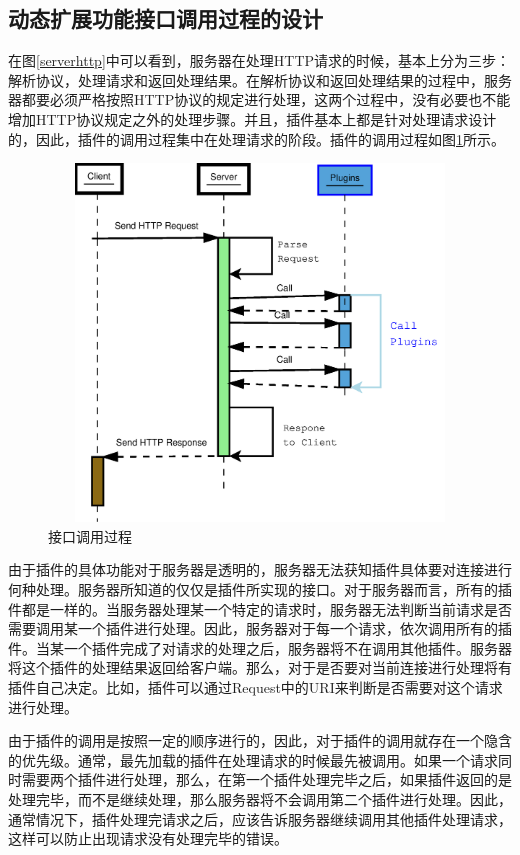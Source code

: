 \documentclass[twoside, xetex]{report}
\begin{document}
\subsection{动态扩展功能接口调用过程的设计}
	在图\ref{serverhttp}中可以看到，服务器在处理HTTP请求的时候，基本上分为三步：解析协议，处理请求和返回处理结果。在解析协议和返回处理结果的过程中，服务器都要必须严格按照HTTP协议的规定进行处理，这两个过程中，没有必要也不能增加HTTP协议规定之外的处理步骤。并且，插件基本上都是针对处理请求设计的，因此，插件的调用过程集中在处理请求的阶段。插件的调用过程如图\ref{httpplugin}所示。
	\begin{figure}[htbp]
	\centering
	\includegraphics[height=9.5cm, width=12cm]{pics/httpplugin.eps}
	\caption{接口调用过程}
	\label{httpplugin}
	\end{figure}
	
	由于插件的具体功能对于服务器是透明的，服务器无法获知插件具体要对连接进行何种处理。服务器所知道的仅仅是插件所实现的接口。对于服务器而言，所有的插件都是一样的。当服务器处理某一个特定的请求时，服务器无法判断当前请求是否需要调用某一个插件进行处理。因此，服务器对于每一个请求，依次调用所有的插件。当某一个插件完成了对请求的处理之后，服务器将不在调用其他插件。服务器将这个插件的处理结果返回给客户端。那么，对于是否要对当前连接进行处理将有插件自己决定。比如，插件可以通过Request中的URI来判断是否需要对这个请求进行处理。
	
	由于插件的调用是按照一定的顺序进行的，因此，对于插件的调用就存在一个隐含的优先级。通常，最先加载的插件在处理请求的时候最先被调用。如果一个请求同时需要两个插件进行处理，那么，在第一个插件处理完毕之后，如果插件返回的是处理完毕，而不是继续处理，那么服务器将不会调用第二个插件进行处理。因此，通常情况下，插件处理完请求之后，应该告诉服务器继续调用其他插件处理请求，这样可以防止出现请求没有处理完毕的错误。
	
\end{document}
